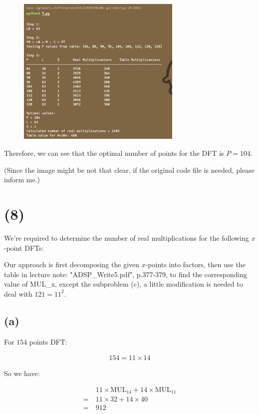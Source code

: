 \documentclass{article}
\begin{document}
\begin{figure}[H]
    \centering
    \includegraphics[width=0.7\textwidth]{HW4_img/7_result.png}
\end{figure}

Therefore, we can see that the optimal number of points for the DFT is $P = 104$.
\bigskip

(Since the image might be not that clear, if the original code file is needed, please inform me.)

\section*{(8)}

We're required to determine the number of real multiplications for the following $x$-point DFTs:
\bigskip

Our approach is first decomposing the given $x$-points into factors, 
then use the table in lecture note: "ADSP\_Write5.pdf", p.377-379,
to find the corresponding value of MUL\_x, except the subproblem (c), 
a little modification is needed to deal with $121 = 11^2$. 
\bigskip


\subsection*{(a)}

For $154$ points DFT:

\begin{align*}
    154 = 11 \times 14
\end{align*}

So we have:

\begin{align*}
    &11 \times \text{MUL}_{14} + 14 \times \text{MUL}_{11} \\
    = \ & 11 \times 32 + 14 \times 40 \\
    = \ & 912
\end{align*}
\end{document}
